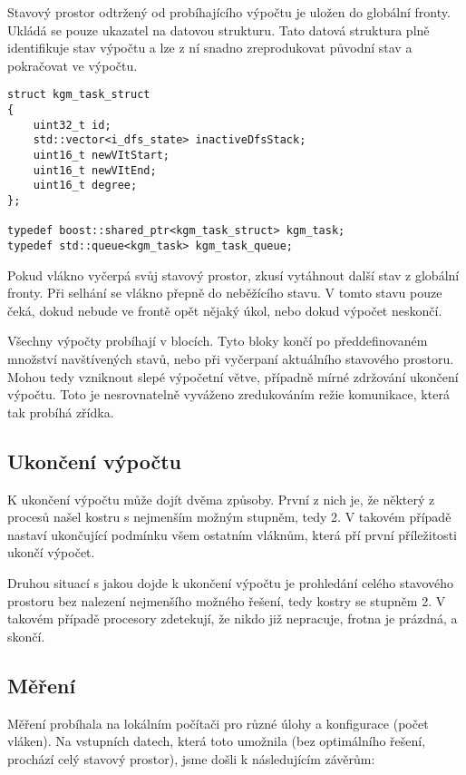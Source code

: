 \documentclass[]{article}
\begin{document}
Stavový prostor odtržený od probíhajícího výpočtu je uložen do globální fronty. Ukládá se pouze ukazatel na datovou strukturu. Tato datová struktura plně identifikuje stav výpočtu a lze z ní snadno zreprodukovat původní stav a pokračovat ve výpočtu.

\begin{verbatim}
struct kgm_task_struct
{
    uint32_t id;
    std::vector<i_dfs_state> inactiveDfsStack;
    uint16_t newVItStart;
    uint16_t newVItEnd;
    uint16_t degree;
};

typedef boost::shared_ptr<kgm_task_struct> kgm_task;
typedef std::queue<kgm_task> kgm_task_queue;
\end{verbatim}

Pokud vlákno vyčerpá svůj stavový prostor, zkusí vytáhnout další stav z globální fronty. Při selhání se vlákno přepně do neběžícího stavu. V tomto stavu pouze čeká, dokud nebude ve frontě opět nějaký úkol, nebo dokud výpočet neskončí.

Všechny výpočty probíhají v blocích. Tyto bloky končí po předdefinovaném množství navštívených stavů, nebo při vyčerpaní aktuálního stavového prostoru. Mohou tedy vzniknout slepé výpočetní větve, případně mírné zdržování ukončení výpočtu. Toto je nesrovnatelně vyváženo zredukováním režie komunikace, která tak probíhá zřídka.

\subsection{Ukončení výpočtu}

K ukončení výpočtu může dojít dvěma způsoby. První z nich je, že některý z procesů našel kostru s nejmenším možným stupněm, tedy 2. V takovém případě nastaví ukončující podmínku všem ostatním vláknům, která pří první příležitosti ukončí výpočet.

Druhou situací s jakou dojde k ukončení výpočtu je prohledání celého stavového prostoru bez nalezení nejmenšího možného řešení, tedy kostry se stupněm 2. V takovém případě procesory zdetekují, že nikdo již nepracuje, frotna je prázdná, a skončí.

\subsection{Měření}

Měření probíhala na lokálním počítači pro různé úlohy a konfigurace (počet vláken). Na vstupních datech, která toto umožnila (bez optimálního řešení, prochází celý stavový prostor), jsme došli k následujícím závěrům:
\end{document}
